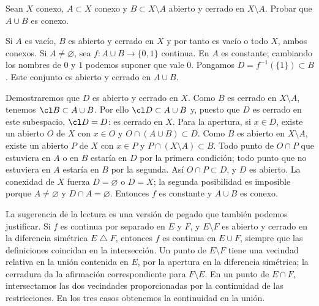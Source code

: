\begin{ejercicio}\label{ej:lectura-17-6}\label{ch17:ex6}
Sean $X$ conexo, $A\subset X$ conexo y $B\subset X\setminus A$ abierto y cerrado en $X\setminus A$. Probar que $A\cup B$ es conexo.
\end{ejercicio}
\begin{solucion}
Si $A$ es vacío, $B$ es abierto y cerrado en $X$ y por tanto es vacío o todo $X$, ambos conexos. Si $A\ne\varnothing$, sea $f:A\cup B\to\{0,1\}$ continua. En $A$ es constante; cambiando los nombres de $0$ y $1$ podemos suponer que vale $0$. Pongamos $D=f^{-1}(\{1\})\subset B$. Este conjunto es abierto y cerrado en $A\cup B$.

Demostraremos que $D$ es abierto y cerrado en $X$. Como $B$ es cerrado en $X\setminus A$, tenemos $\cl B\subset A\cup B$. Por ello $\cl D\subset A\cup B$ y, puesto que $D$ es cerrado en este subespacio, $\cl D=D$: es cerrado en $X$. Para la apertura, si $x\in D$, existe un abierto $O$ de $X$ con $x\in O$ y $O\cap(A\cup B)\subset D$. Como $B$ es abierto en $X\setminus A$, existe un abierto $P$ de $X$ con $x\in P$ y $P\cap(X\setminus A)\subset B$. Todo punto de $O\cap P$ que estuviera en $A$ o en $B$ estaría en $D$ por la primera condición; todo punto que no estuviera en $A$ estaría en $B$ por la segunda. Así $O\cap P\subset D$, y $D$ es abierto. La conexidad de $X$ fuerza $D=\varnothing$ o $D=X$; la segunda posibilidad es imposible porque $A\ne\varnothing$ y $D\cap A=\varnothing$. Entonces $f$ es constante y $A\cup B$ es conexo.

La sugerencia de la lectura es una versión de pegado que también podemos justificar. Si $f$ es continua por separado en $E$ y $F$, y $E\setminus F$ es abierto y cerrado en la diferencia simétrica $E\mathbin{\triangle}F$, entonces $f$ es continua en $E\cup F$, siempre que las definiciones coincidan en la intersección. Un punto de $E\setminus F$ tiene una vecindad relativa en la unión contenida en $E$, por la apertura en la diferencia simétrica; la cerradura da la afirmación correspondiente para $F\setminus E$. En un punto de $E\cap F$, intersectamos las dos vecindades proporcionadas por la continuidad de las restricciones. En los tres casos obtenemos la continuidad en la unión.
\end{solucion}

